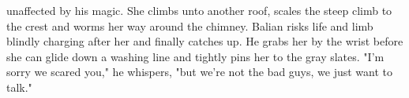 unaffected by his magic. She climbs unto another roof, scales the steep climb to the crest and worms her way around the chimney. Balian risks life and limb blindly charging after her and finally catches up. He grabs her by the wrist before she can glide down a washing line and tightly pins her to the gray slates. "I'm sorry we scared you," he whispers, "but we're not the bad guys, we just want to talk." 